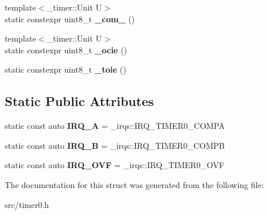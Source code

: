 \begin{DoxyCompactItemize}
\item 
{\footnotesize template$<$\+\_\+timer\+::\+Unit U$>$ }\\static constexpr uint8\+\_\+t {\bfseries \+\_\+com\+\_} ()\hypertarget{struct__timer0_1_1TimerDef_ae72314a7783b7d541042ccef9c9253b5}{}\label{struct__timer0_1_1TimerDef_ae72314a7783b7d541042ccef9c9253b5}

\item 
{\footnotesize template$<$\+\_\+timer\+::\+Unit U$>$ }\\static constexpr uint8\+\_\+t {\bfseries \+\_\+ocie} ()\hypertarget{struct__timer0_1_1TimerDef_a402e897dbe98439fb2697ab1c548f466}{}\label{struct__timer0_1_1TimerDef_a402e897dbe98439fb2697ab1c548f466}

\item 
static constexpr uint8\+\_\+t {\bfseries \+\_\+toie} ()\hypertarget{struct__timer0_1_1TimerDef_af0fae9725deecc5eba56c7fcbcee3d4e}{}\label{struct__timer0_1_1TimerDef_af0fae9725deecc5eba56c7fcbcee3d4e}

\end{DoxyCompactItemize}
\subsection*{Static Public Attributes}
\begin{DoxyCompactItemize}
\item 
static const auto {\bfseries I\+R\+Q\+\_\+A} = \+\_\+irqs\+::\+I\+R\+Q\+\_\+\+T\+I\+M\+E\+R0\+\_\+\+C\+O\+M\+PA\hypertarget{struct__timer0_1_1TimerDef_a6a025f30a176807a46e9a53e3ab81edb}{}\label{struct__timer0_1_1TimerDef_a6a025f30a176807a46e9a53e3ab81edb}

\item 
static const auto {\bfseries I\+R\+Q\+\_\+B} = \+\_\+irqs\+::\+I\+R\+Q\+\_\+\+T\+I\+M\+E\+R0\+\_\+\+C\+O\+M\+PB\hypertarget{struct__timer0_1_1TimerDef_adab020411a7f59b24e3d534bd8c58493}{}\label{struct__timer0_1_1TimerDef_adab020411a7f59b24e3d534bd8c58493}

\item 
static const auto {\bfseries I\+R\+Q\+\_\+\+O\+VF} = \+\_\+irqs\+::\+I\+R\+Q\+\_\+\+T\+I\+M\+E\+R0\+\_\+\+O\+VF\hypertarget{struct__timer0_1_1TimerDef_a482092f3baf313478d0fecb10c358e28}{}\label{struct__timer0_1_1TimerDef_a482092f3baf313478d0fecb10c358e28}

\end{DoxyCompactItemize}


The documentation for this struct was generated from the following file\+:\begin{DoxyCompactItemize}
\item 
src/timer0.\+h\end{DoxyCompactItemize}
